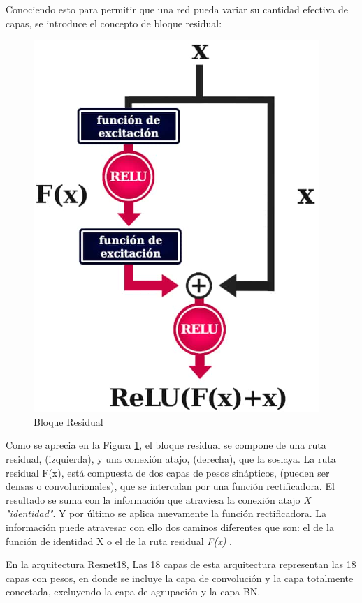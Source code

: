 Conociendo esto para permitir que una red pueda variar su cantidad efectiva de capas, se introduce el concepto de bloque residual:

\begin{figure}[ht]
	\centering
	\includegraphics[scale=0.6]{Figs/67.png}
	\caption{Bloque Residual}
	\label{fig:Bloque}
\end{figure}

Como se aprecia en la Figura \ref{fig:Bloque}, el bloque residual se compone de una ruta residual, (izquierda), y una conexión atajo, (derecha), que la soslaya. La ruta residual F(x), está compuesta de dos capas de pesos sinápticos, (pueden ser densas o convolucionales), que se intercalan por una función rectificadora. El resultado se suma con la información que atraviesa la conexión atajo \textit{X "identidad"}. Y por último se aplica nuevamente la función rectificadora. La información puede atravesar con ello dos caminos diferentes que son: el de la función de identidad X o el de la ruta residual \textit{F(x)} \cite{ref_5}.

\newpage
En la arquitectura Resnet18, Las 18 capas de esta arquitectura representan las 18 capas con pesos, en donde se incluye la capa de convolución y la capa totalmente conectada, excluyendo la capa de agrupación y la capa BN.

